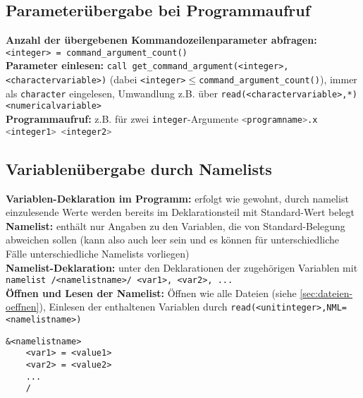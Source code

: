 \documentclass[a4paper, twocolumn]{scrarticle}
\begin{document}
\subsection{Parameterübergabe bei Programmaufruf}
\textbf{Anzahl der übergebenen Kommandozeilenparameter abfragen:} \lstinline|<integer> = command_argument_count()|\\
\textbf{Parameter einlesen:} \lstinline|call get_command_argument(<integer>, <charactervariable>)| (dabei \lstinline|<integer>|$\leq$\lstinline|command_argument_count()|), immer als \lstinline|character| eingelesen, Umwandlung z.B. über \lstinline|read(<charactervariable>,*) <numericalvariable>|\\
\textbf{Programmaufruf:} z.B. für zwei \lstinline|integer|-Argumente \lstinline[language=bash]|<programname>.x <integer1> <integer2>|

\subsection{Variablenübergabe durch Namelists}
\textbf{Variablen-Deklaration im Programm:} erfolgt wie gewohnt, durch namelist einzulesende Werte werden bereits im Deklarationsteil mit Standard-Wert belegt\\
\textbf{Namelist:} enthält nur Angaben zu den Variablen, die von Standard-Belegung abweichen sollen (kann also auch leer sein und es können für unterschiedliche Fälle unterschiedliche Namelists vorliegen)\\
\textbf{Namelist-Deklaration:} unter den Deklarationen der zugehörigen Variablen mit \lstinline|namelist /<namelistname>/ <var1>, <var2>, ...|\\
\textbf{Öffnen und Lesen der Namelist:} Öffnen wie alle Dateien (siehe \cref{sec:dateien-oeffnen}), Einlesen der enthaltenen Variablen durch \lstinline|read(<unitinteger>,NML=<namelistname>)|
\begin{lstlisting}[caption={Struktur Namelist-Datei <namelistname>.nml}]
	&<namelistname>
	<var1> = <value1>
	<var2> = <value2>
	...
	/
\end{lstlisting}
\end{document}
